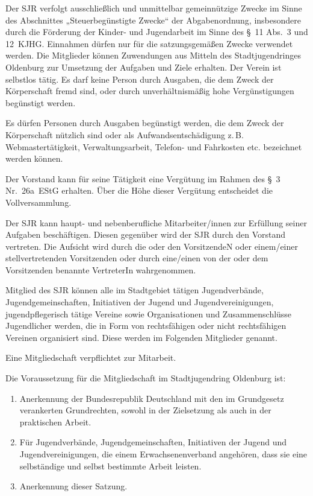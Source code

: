 \documentclass[10pt,a4paper,oneside,parskip=half]{scrartcl}
\begin{document}
\begin{contract}
Der SJR verfolgt ausschließlich und unmittelbar gemeinnützige Zwecke im Sinne des Abschnittes „Steuerbegünstigte Zwecke“ der Abgabenordnung, insbesondere durch die Förderung der Kinder- und Jugendarbeit im Sinne des §~11 Abs.~3 und 12~KJHG. Einnahmen dürfen nur für die satzungsgemäßen Zwecke verwendet werden. Die Mitglieder können Zuwendungen aus Mitteln des Stadtjugendringes Oldenburg zur Umsetzung der Aufgaben und Ziele erhalten. Der Verein ist selbstlos tätig. Es darf keine Person durch Ausgaben, die dem Zweck der Körperschaft fremd sind, oder durch unverhältnismäßig hohe Vergünstigungen begünstigt werden.

Es dürfen Personen durch Ausgaben begünstigt werden, die dem Zweck der Körperschaft nützlich sind oder als Aufwandsentschädigung z.\,B. Webmastertätigkeit, Verwaltungsarbeit, Telefon- und Fahrkosten etc. bezeichnet werden können.

Der Vorstand kann für seine Tätigkeit eine Vergütung im Rahmen des §~3 Nr.~26a~EStG erhalten. Über die Höhe dieser Vergütung entscheidet die Vollversammlung.

Der SJR kann haupt- und nebenberufliche Mitarbeiter/innen zur Erfüllung seiner Aufgaben beschäftigen. Diesen gegenüber wird der SJR durch den Vorstand vertreten. Die Aufsicht wird durch die oder den VorsitzendeN oder einem/einer stellvertretenden Vorsitzenden oder durch eine/einen von der oder dem Vorsitzenden benannte VertreterIn wahrgenommen.

Mitglied des SJR können alle im Stadtgebiet tätigen Jugendverbände, Jugendgemeinschaften, Initiativen der Jugend und Jugendvereinigungen, jugendpflegerisch tätige Vereine sowie Organisationen und Zusammenschlüsse Jugendlicher werden, die in Form von rechtsfähigen oder nicht rechtsfähigen Vereinen organisiert sind. Diese werden im Folgenden Mitglieder genannt.

Eine Mitgliedschaft verpflichtet zur Mitarbeit.\label{mitgliedschaft_mitarbeit}

Die Voraussetzung für die Mitgliedschaft im Stadtjugendring Oldenburg ist:
\begin{enumerate}
\item Anerkennung der Bundesrepublik Deutschland mit den im Grundgesetz verankerten Grundrechten, sowohl in der Zielsetzung als auch in der praktischen Arbeit.
\item Für Jugendverbände, Jugendgemeinschaften, Initiativen der Jugend und Jugendvereinigungen, die einem Erwachsenenverband angehören, dass sie eine selbständige und selbst bestimmte Arbeit leisten.
\item Anerkennung dieser Satzung.
\end{enumerate}


\end{contract}
\end{document}
